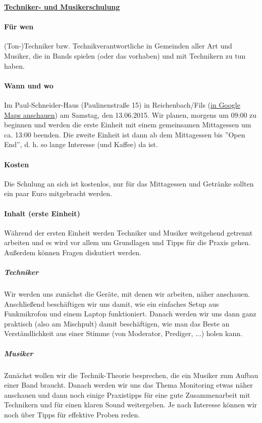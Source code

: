 \documentclass[10pt,a4paper]{article}
\begin{document}
%
%
\begin{center}
\underline{\textbf{\Large Techniker- und Musikerschulung}}
\end{center}
\setlength{\parskip}{-5pt}
%
%
\paragraph{Für wen} (Ton-)Techniker bzw. Technikverantwortliche in Gemeinden aller Art und Musiker, die in Bands spielen (oder das vorhaben) und mit Technikern zu tun haben.

\paragraph{Wann und wo} Im Paul-Schneider-Haus (Paulinenstraße 15) in Reichenbach/Fils (\href{https://www.google.de/maps/place/Paul-Schneider-Haus/}{in Google Maps anschauen}) am Samstag, den 13.06.2015. Wir planen, morgens um 09:00 zu beginnen und werden die erste Einheit mit einem gemeinsamen Mittagessen um ca. 13:00 beenden. Die zweite Einheit ist dann ab dem Mittagessen bis ''Open End'', d. h. so lange Interesse (und Kaffee) da ist.

\paragraph{Kosten} Die Schulung an sich ist kostenlos, nur für das Mittagessen und Getränke sollten ein paar Euro mitgebracht werden.

\paragraph{Inhalt (erste Einheit)} Während der ersten Einheit werden Techniker und Musiker weitgehend getrennt arbeiten und es wird vor allem um Grundlagen und Tipps für die Praxis gehen. Außerdem können Fragen diskutiert werden.
%
\setlength{\parskip}{-15pt}
%
\subparagraph{Techniker} Wir werden uns zunächst die Geräte, mit denen wir arbeiten, näher anschauen. Anschließend beschäftigen wir uns damit, wie ein einfaches Setup aus Funkmikrofon und einem Laptop funktioniert. Danach werden wir uns dann ganz praktisch (also am Mischpult) damit beschäftigen, wie man das Beste an Verständlichkeit aus einer Stimme (von Moderator, Prediger, ...) holen kann.
%
\subparagraph{Musiker} Zunächst wollen wir die Technik-Theorie besprechen, die ein Musiker zum Aufbau einer Band braucht. Danach werden wir uns das Thema Monitoring etwas näher anschauen und dann noch einige Praxistipps für eine gute Zusammenarbeit mit Technikern  und für einen klaren Sound weitergeben. Je nach Interesse können wir noch über Tipps für effektive Proben reden.
\end{document}
